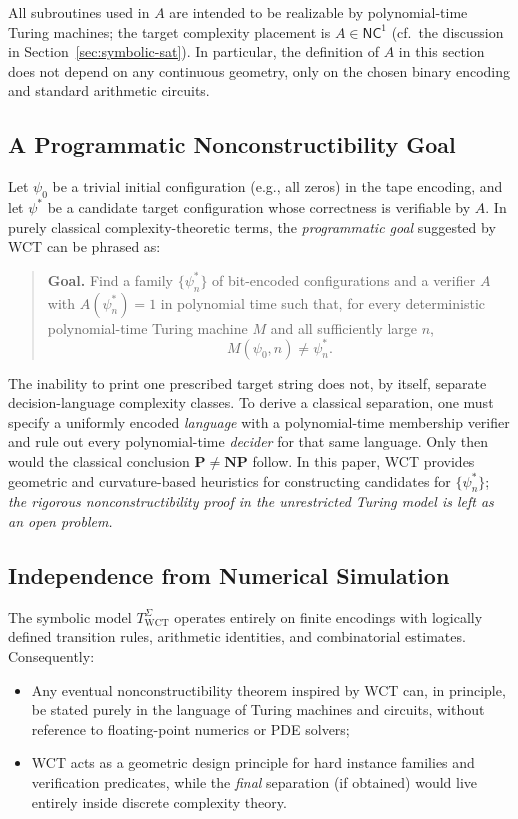 \documentclass[12pt]{article}
\theoremstyle{remark}
\begin{document}
All subroutines used in \(A\) are intended to be realizable by polynomial-time Turing machines; the target complexity placement is \(A \in \textsf{NC}^1\) (cf.\ the discussion in Section~\ref{sec:symbolic-sat}). In particular, the definition of \(A\) in this section does not depend on any continuous geometry, only on the chosen binary encoding and standard arithmetic circuits.

\subsection{A Programmatic Nonconstructibility Goal}

Let \( \psi_0 \) be a trivial initial configuration (e.g., all zeros) in the tape encoding, and let \( \psi^* \) be a candidate target configuration whose correctness is verifiable by \(A\). In purely classical complexity-theoretic terms, the \emph{programmatic goal} suggested by WCT can be phrased as:

\begin{quote}
\textbf{Goal.} Find a family \(\{\psi^*_n\}\) of bit-encoded configurations and a verifier \(A\) with \(A(\psi^*_n)=1\) in polynomial time such that, for every deterministic polynomial-time Turing machine \(M\) and all sufficiently large \(n\),
\[
M(\psi_0,n) \neq \psi^*_n.
\]
\end{quote}

The inability to print one prescribed target string does not, by itself,
separate decision-language complexity classes. To derive a classical
separation, one must specify a uniformly encoded \emph{language} with a
polynomial-time membership verifier and rule out every polynomial-time
\emph{decider} for that same language. Only then would the classical
conclusion $\mathbf{P}\ne\mathbf{NP}$ follow. In this paper, WCT provides geometric and curvature-based heuristics for constructing candidates for \(\{\psi^*_n\}\); \emph{the rigorous nonconstructibility proof in the unrestricted Turing model is left as an open problem.}

\subsection{Independence from Numerical Simulation}

The symbolic model \( T_{\text{WCT}}^\Sigma \) operates entirely on finite encodings with logically defined transition rules, arithmetic identities, and combinatorial estimates. Consequently:

\begin{itemize}
  \item Any eventual nonconstructibility theorem inspired by WCT can, in principle, be stated purely in the language of Turing machines and circuits, without reference to floating-point numerics or PDE solvers;
  \item WCT acts as a geometric design principle for hard instance families and verification predicates, while the \emph{final} separation (if obtained) would live entirely inside discrete complexity theory.
\end{itemize}
\end{document}
